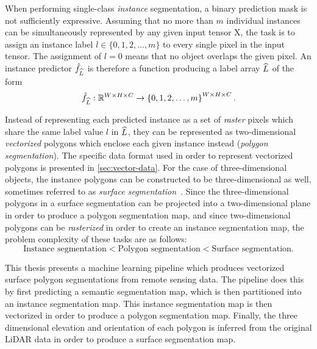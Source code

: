 When performing single-class \emph{instance} segmentation, a binary prediction mask is not sufficiently expressive.
Assuming that no more than $m$ individual instances can be simultaneously represented by any given input tensor X, the task is to assign an instance label $l \in \{0, 1, 2, \dots, m\}$ to every single pixel in the input tensor.
The assignment of $l = 0$ means that no object overlaps the given pixel.
An instance predictor $\hat{f}_{\widehat{L}}$ is therefore a function producing a label array $\widehat{L}$ of the form
\begin{equation*}
  \hat{f}_{\widehat{L}}: \mathbb{R}^{W \times H \times C}
  \rightarrow
  \left\{
    0, 1, 2, \dots, m
  \right\}^{W \times H \times C}.
\end{equation*}

Instead of representing each predicted instance as a set of \emph{raster} pixels which share the same label value $l$ in $\widehat{L}$, they can be represented as two-dimensional \emph{vectorized} polygons which enclose each given instance instead (\textit{polygon segmentation}).
The specific data format used in order to represent vectorized polygons is presented in \cref{sec:vector-data}.
For the case of three-dimensional objects, the instance polygons can be constructed to be three-dimensional as well, sometimes referred to as \textit{surface segmentation}~\cite{surface-segmentation-1,surface-segmentation-2}.
Since the three-dimensional polygons in a surface segmentation can be projected into a two-dimensional plane in order to produce a polygon segmentation map, and since two-dimensional polygons can be \textit{rasterized} in order to create an instance segmentation map, the problem complexity of these tasks are as follows:
%
\begin{equation*}
  \text{Instance segmentation}
  <
  \text{Polygon segmentation}
  <
  \text{Surface segmentation}.
\end{equation*}

This thesis presents a machine learning pipeline which produces vectorized surface polygon segmentations from remote sensing data.
The pipeline does this by first predicting a semantic segmentation map, which is then partitioned into an instance segmentation map.
This instance segmentation map is then vectorized in order to produce a polygon segmentation map.
Finally, the three dimensional elevation and orientation of each polygon is inferred from the original LiDAR data in order to produce a surface segmentation map.
